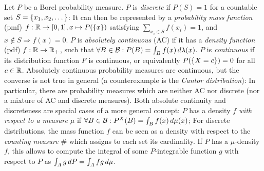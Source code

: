 \documentclass[a4paper]{scrreprt}
\newcommand{\Rp}{\mathbb{R}_+}
\newcommand{\B}{\mathcal{B}}
\begin{document}
    
    Let $P$ be a Borel probability measure.
    $P$ is \emph{discrete} if $P(S) = 1$ for a countable set $S = \{x_1, x_2, \dots\}$: It can then be represented by a \emph{probability mass function} (pmf) $f: \mathbb{R} \to [0, 1], x \mapsto P(\{x\})$ satisfying $\sum_{x_i \in S} f(x_i) = 1$, and $x \notin S \Rightarrow f(x) = 0$.
    $P$ is \emph{absolutely continuous} (AC) if it has a \emph{density function} (pdf) $f: \R \to \Rp$, such that $\forall B \in \B: P(B) = \lintegral{B}{f(x)}{\lambda(x)}$.
    $P$ is \emph{continuous} if its distribution function $F$ is continuous, or equivalently $P(\{X = c\}) = 0$ for all $c \in \mathbb{R}$.
    Absolutely continuous probability measures are continuous, but the converse is not true in general (a counterexample is the \emph{Cantor distribution}): In particular, there are probability measures which are neither AC nor discrete (nor a mixture of AC and discrete measures).
    Both absolute continuity and discreteness are special cases of a more general concept: $P$ has a density $f$ \emph{with respect to a measure $\mu$} if $\forall B \in \B: P^X(B) = \lintegral{B}{f(x)}{\mu(x)}$; For discrete distributions, the mass function $f$ can be seen as a density with respect to the \emph{counting measure} $\#$ which assigns to each set its cardinality.
    If $P$ has a $\mu$-density $f$, this allows to compute the integral of some $P$-integrable function $g$ with respect to $P$ as $\int_{A} g \, dP = \int_{A} f g \, d\mu$.
    
\end{document}
